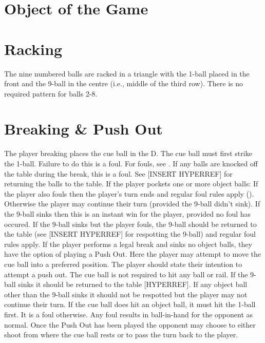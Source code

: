 
\section{Object of the Game} \label{9ball:description}


\section{Racking} \label{9ball:racking}

 \RackingUp[9ball]%
 \DetermineWhoRacks%
\TableDiagram[9ball]%
\subruleitem The nine numbered balls are racked in a triangle with the 1-ball placed in the front and the 9-ball in the centre (i.e., middle of the third row). There is no required pattern for balls 2-8.%
\subruleitem \TightlyPacked%
\subruleitem \RackPlacement[9ball]%
\subruleitem \RackingTool[9ball]%
\subruleitem \RackInspection[9ball]%

\section{Breaking \& Push Out} \label{9ball:breaking}

 The player breaking places the cue ball in the D.%
 The cue ball must first strike the 1-ball. Failure to do this is a foul. For fouls, see .%
 \CueBallMissOffBreak[9ball]%
 \CueBallRailOffBreak%
 \CueBallSinkOffBreak%
 If any balls are knocked off the table during the break, this is a foul. See [INSERT HYPERREF] for returning the balls to the table.%
 If the player pockets one or more object balls:%
\subruleitem If the player also fouls then the player's turn ends and regular foul rules apply ().%
\subruleitem Otherwise the player may continue their turn (provided the 9-ball didn't sink).%
\subruleitem If the 9-ball sinks then this is an instant win for the player, provided no foul has occured.%
\subruleitem If the 9-ball sinks but the player fouls, the 9-ball should be returned to the table (see [INSERT HYPERREF] for respotting the 9-ball) and regular foul rules apply.%
If the player performs a legal break and sinks no object balls, they have the option of playing a Push Out.%
\subruleitem Here the player may attempt to move the cue ball into a preferred position.%
\subruleitem The player should state their intention to attempt a push out.%
\subruleitem The cue ball is not required to hit any ball or rail.%
\subruleitem If the 9-ball sinks it should be returned to the table [HYPERREF].%
\subruleitem If any object ball other than the 9-ball sinks it should not be respotted but the player may not continue their turn.%
\subruleitem If the cue ball does hit an object ball, it must hit the 1-ball first. It is a foul otherwise.%
\subruleitem Any foul results in ball-in-hand for the opponent as normal.%
\subruleitem Once the Push Out has been played the opponent may choose to either shoot from where the cue ball rests or to pass the turn back to the player.%

